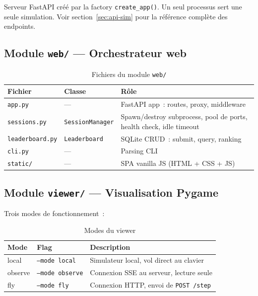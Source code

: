 \documentclass[a4paper, 11pt, french]{article}
\newcommand{\code}[1]{\texttt{#1}}
\begin{document}
Serveur FastAPI créé par la factory \code{create\_app()}.  Un seul
processus sert une seule simulation.  Voir section~\ref{sec:api-sim}
pour la référence complète des endpoints.

\subsection{Module \code{web/} --- Orchestrateur web}

\begin{table}[H]
\centering\small
\begin{tabular}{llp{7.5cm}}
\toprule
\textbf{Fichier} & \textbf{Classe} & \textbf{Rôle} \\
\midrule
\code{app.py}         & ---                & FastAPI app~: routes, proxy, middleware \\
\code{sessions.py}    & \code{SessionManager} & Spawn/destroy subprocess, pool de ports,
                                                 health check, idle timeout \\
\code{leaderboard.py} & \code{Leaderboard}    & SQLite CRUD~: submit, query, ranking \\
\code{cli.py}         & ---                & Parsing CLI \\
\code{static/}        & ---                & SPA vanilla JS (HTML + CSS + JS) \\
\bottomrule
\end{tabular}
\caption{Fichiers du module \code{web/}}
\end{table}

\subsection{Module \code{viewer/} --- Visualisation Pygame}

Trois modes de fonctionnement~:

\begin{table}[H]
\centering\small
\begin{tabular}{llp{7.5cm}}
\toprule
\textbf{Mode} & \textbf{Flag} & \textbf{Description} \\
\midrule
local   & \code{--mode local}   & Simulateur local, vol direct au clavier \\
observe & \code{--mode observe} & Connexion SSE au serveur, lecture seule \\
fly     & \code{--mode fly}     & Connexion HTTP, envoi de \code{POST /step} \\
\bottomrule
\end{tabular}
\caption{Modes du viewer}
\end{table}
\end{document}
